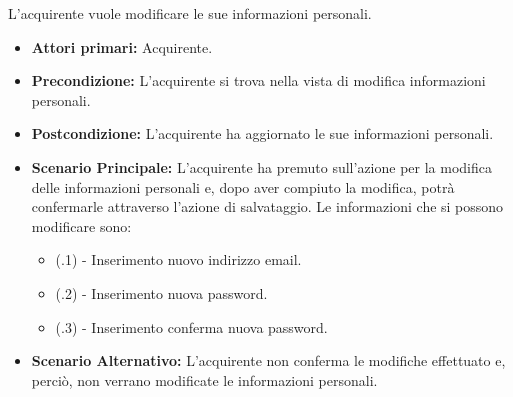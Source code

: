 


L'acquirente vuole modificare le sue informazioni personali.
\begin{itemize}
    \item \textbf{Attori primari:} Acquirente.
    \item \textbf{Precondizione:} L'acquirente si trova nella vista di modifica informazioni personali.
    \item \textbf{Postcondizione:} L'acquirente ha aggiornato le sue informazioni personali.
    \item \textbf{Scenario Principale:} L'acquirente ha premuto sull'azione per la modifica delle informazioni personali e, dopo aver compiuto la modifica, potrà confermarle attraverso l'azione di salvataggio. Le informazioni che si possono modificare sono:
    \begin{itemize}
        \item (\actualUC.1) - Inserimento nuovo indirizzo email.
        \item (\actualUC.2) - Inserimento nuova password.
        \item (\actualUC.3) - Inserimento conferma nuova password.
    \end{itemize}
    \item \textbf{Scenario Alternativo:} L'acquirente non conferma le modifiche effettuato e, perciò, non verrano modificate le informazioni personali.
\end{itemize}

\resetSubUC

